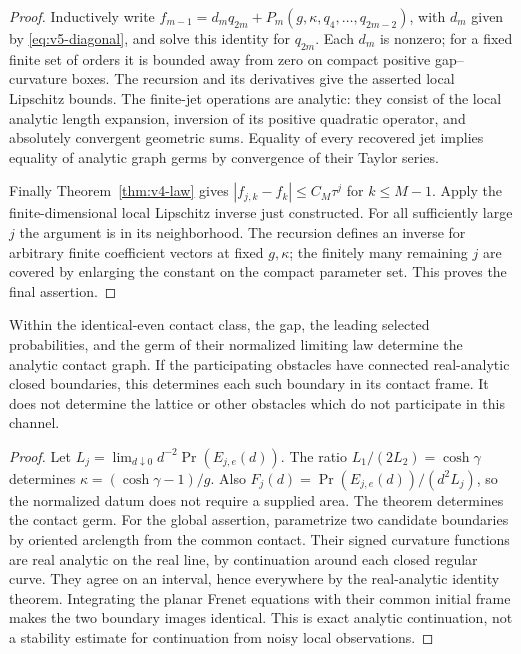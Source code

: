\begin{proof}
Inductively write
$f_{m-1}=d_m q_{2m}+P_m(g,\kappa,q_4,\ldots,q_{2m-2})$, with $d_m$
given by \eqref{eq:v5-diagonal}, and solve this identity for $q_{2m}$.
Each $d_m$ is nonzero; for a fixed finite set of orders it is bounded
away from zero on compact positive gap--curvature boxes. The recursion
and its derivatives give the asserted local Lipschitz bounds. The
finite-jet operations are analytic: they consist of the local analytic
length expansion, inversion of its positive quadratic operator, and
absolutely convergent geometric sums. Equality of every recovered jet
implies equality of analytic graph germs by convergence of their
Taylor series.

Finally Theorem~\ref{thm:v4-law} gives
$|f_{j,k}-f_k|\le C_M\tau^j$ for $k\le M-1$. Apply the finite-dimensional
local Lipschitz inverse just constructed. For all sufficiently large
$j$ the argument is in its neighborhood. The recursion defines an
inverse for arbitrary finite coefficient vectors at fixed $g,\kappa$;
the finitely many remaining $j$ are covered by enlarging the constant
on the compact parameter set. This proves the final assertion.
\end{proof}

\begin{corollary}
\label{cor:v5-analytic-rigidity}
Within the identical-even contact class, the gap, the leading selected
probabilities, and the germ of their normalized limiting law determine
the analytic contact graph. If the participating obstacles have connected
real-analytic closed boundaries, this determines each such boundary in
its contact frame. It does not determine the lattice or other obstacles
which do not participate in this channel.
\end{corollary}
\begin{proof}
Let $L_j=\lim_{d\downarrow0}d^{-2}\Pr(E_{j,e}(d))$.
The ratio $L_1/(2L_2)=\cosh\gamma$ determines
$\kappa=(\cosh\gamma-1)/g$. Also
$F_j(d)=\Pr(E_{j,e}(d))/(d^2L_j)$, so the normalized datum does not
require a supplied area. The theorem determines the contact germ.
For the global assertion, parametrize two candidate boundaries by
oriented arclength from the common contact. Their signed curvature
functions are real analytic on the real line, by continuation around
each closed regular curve. They agree on an interval, hence everywhere
by the real-analytic identity theorem. Integrating the planar Frenet
equations with their common initial frame makes the two boundary images
identical. This is exact analytic continuation, not a stability estimate
for continuation from noisy local observations.
\end{proof}

